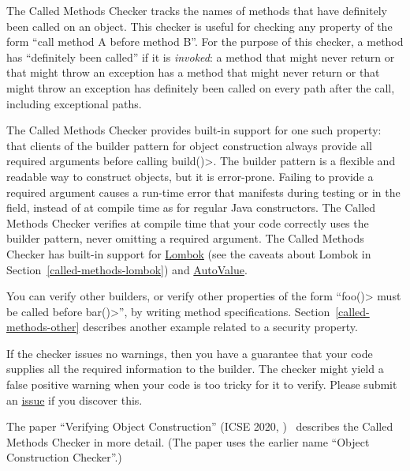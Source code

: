 \htmlhr
{}

The Called Methods Checker tracks the names of methods that have definitely
been called on an object. This checker is useful for checking any property
of the form ``call method A before method B''. For the purpose of this
checker, a method has ``definitely been called'' if it is \emph{invoked}:
a method that might never return or that might throw an exception has
a method that might never return or that might throw an exception has
definitely been called on every path after the call, including exceptional paths.

The Called Methods Checker provides built-in support for one such property:
that clients of the builder pattern for object
construction always provide all required arguments before calling
\<build()>.  The builder pattern is a flexible and readable way to
construct objects, but it is error-prone.  Failing to provide
a required argument causes a run-time error that manifests during testing
or in the field, instead of at compile time as for regular Java
constructors.  The Called Methods Checker verifies at compile time that
your code correctly uses the builder pattern, never omitting a required
argument. The Called Methods Checker has built-in support for
\href{https://projectlombok.org/}{Lombok} (see the caveats about Lombok in
Section~\ref{called-methods-lombok}) and
\href{https://github.com/google/auto/blob/master/value/userguide/index.md}{AutoValue}.

You can verify other builders, or verify other properties of the form
``\<foo()> must be called before \<bar()>'', by writing method specifications.
Section~\ref{called-methods-other} describes another example related to a
security property.

If the checker issues no warnings, then you have a guarantee that your code
supplies all the required information to the builder.  The checker might
yield a false positive warning when your code is too tricky for it to
verify.  Please submit an
\href{https://github.com/typetools/checker-framework/issues}{issue} if you
discover this.

The paper ``Verifying Object Construction'' (ICSE 2020,
)~\cite{KelloggRSSE2020}
describes the Called Methods Checker in more detail.  (The paper uses the
earlier name ``Object Construction Checker''.)


